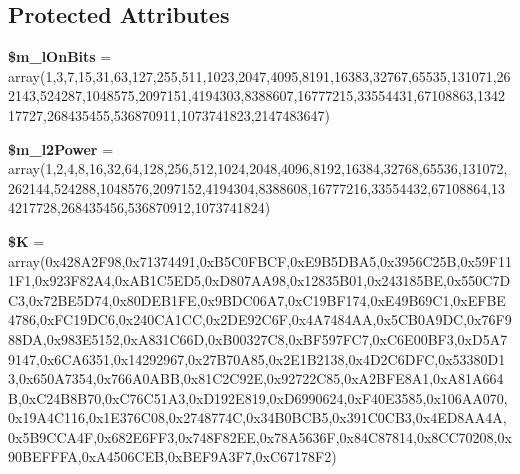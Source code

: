 \subsection*{Protected Attributes}
\begin{DoxyCompactItemize}
\item 
\hypertarget{classauth__sha256_acf67c7a84fe59f779e61f6a595d7cd85}{{\bfseries \$m\-\_\-l\-On\-Bits} = array(1,3,7,15,31,63,127,255,511,1023,2047,4095,8191,16383,32767,65535,131071,262143,524287,1048575,2097151,4194303,8388607,16777215,33554431,67108863,134217727,268435455,536870911,1073741823,2147483647)}\label{classauth__sha256_acf67c7a84fe59f779e61f6a595d7cd85}

\item 
\hypertarget{classauth__sha256_a3f031de215acf09a4ba9b581f623f685}{{\bfseries \$m\-\_\-l2\-Power} = array(1,2,4,8,16,32,64,128,256,512,1024,2048,4096,8192,16384,32768,65536,131072,262144,524288,1048576,2097152,4194304,8388608,16777216,33554432,67108864,134217728,268435456,536870912,1073741824)}\label{classauth__sha256_a3f031de215acf09a4ba9b581f623f685}

\item 
\hypertarget{classauth__sha256_ade6f5d04b2c270bc1de4a5e00cebd7ff}{{\bfseries \$\-K} = array(0x428\-A2\-F98,0x71374491,0x\-B5\-C0\-F\-B\-C\-F,0x\-E9\-B5\-D\-B\-A5,0x3956\-C25\-B,0x59\-F111\-F1,0x923\-F82\-A4,0x\-A\-B1\-C5\-E\-D5,0x\-D807\-A\-A98,0x12835\-B01,0x243185\-B\-E,0x550\-C7\-D\-C3,0x72\-B\-E5\-D74,0x80\-D\-E\-B1\-F\-E,0x9\-B\-D\-C06\-A7,0x\-C19\-B\-F174,0x\-E49\-B69\-C1,0x\-E\-F\-B\-E4786,0x\-F\-C19\-D\-C6,0x240\-C\-A1\-C\-C,0x2\-D\-E92\-C6\-F,0x4\-A7484\-A\-A,0x5\-C\-B0\-A9\-D\-C,0x76\-F988\-D\-A,0x983\-E5152,0x\-A831\-C66\-D,0x\-B00327\-C8,0x\-B\-F597\-F\-C7,0x\-C6\-E00\-B\-F3,0x\-D5\-A79147,0x6\-C\-A6351,0x14292967,0x27\-B70\-A85,0x2\-E1\-B2138,0x4\-D2\-C6\-D\-F\-C,0x53380\-D13,0x650\-A7354,0x766\-A0\-A\-B\-B,0x81\-C2\-C92\-E,0x92722\-C85,0x\-A2\-B\-F\-E8\-A1,0x\-A81\-A664\-B,0x\-C24\-B8\-B70,0x\-C76\-C51\-A3,0x\-D192\-E819,0x\-D6990624,0x\-F40\-E3585,0x106\-A\-A070,0x19\-A4\-C116,0x1\-E376\-C08,0x2748774\-C,0x34\-B0\-B\-C\-B5,0x391\-C0\-C\-B3,0x4\-E\-D8\-A\-A4\-A,0x5\-B9\-C\-C\-A4\-F,0x682\-E6\-F\-F3,0x748\-F82\-E\-E,0x78\-A5636\-F,0x84\-C87814,0x8\-C\-C70208,0x90\-B\-E\-F\-F\-F\-A,0x\-A4506\-C\-E\-B,0x\-B\-E\-F9\-A3\-F7,0x\-C67178\-F2)}\label{classauth__sha256_ade6f5d04b2c270bc1de4a5e00cebd7ff}

\end{DoxyCompactItemize}


